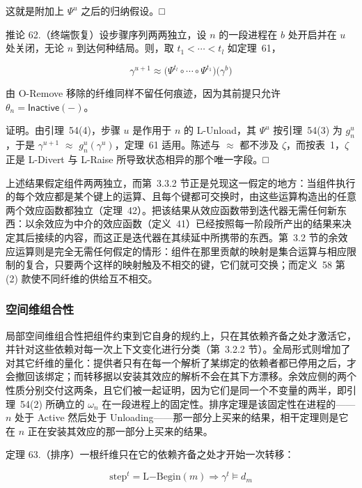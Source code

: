 \documentclass[
  10
]{article}
\begin{document}
这就是附加上 \(\Psi ^ { u }\) 之后的归纳假设。□

推论 62.（终端恢复）设步骤序列两两独立，设 \(n\) 的一段进程在 \(b\) 处开启并在 \(u\) 处关闭，无论 \(n\) 到达何种结局。则，取 \(t _ { 1 } < \cdots < t _ { l }\) 如定理~61，

\[
\gamma ^ { u + 1 } \approx \bigl ( \Psi ^ { t _ { l } } \circ \cdots \circ \Psi ^ { t _ { 1 } } \bigr ) \bigl ( \gamma ^ { b } \bigr )\tag{57}
\]

由 O-Remove 移除的纤维同样不留任何痕迹，因为其前提只允许 \(\theta _ { n } = \mathsf { I n a c t i v e } ( - )\)。

证明。由引理~54(4)，步骤 \(u\) 是作用于 \(n\) 的 L-Unload，其 \(\Psi ^ { u }\) 按引理~54(3) 为 \(g _ { n } ^ { u }\)，于是 \(\gamma ^ { u + 1 }\) $\approx$ \(g _ { n } ^ { u } ( \gamma ^ { u } )\)，定理~61 适用。陈述与 $\approx$ 都不涉及 \(\zeta\)，而按表~1，\(\zeta\) 正是 L-Divert 与 L-Raise 所导致状态相异的那个唯一字段。□

上述结果假定组件两两独立，而第~3.3.2 节正是兑现这一假定的地方：当组件执行的每个效应都是某个键上的运算、且每个键都可交换时，由这些运算构造出的任意两个效应函数都独立（定理~42）。把该结果从效应函数带到迭代器无需任何新东西：以余效应为中介的效应函数（定义~41）已经按照每一阶段所产出的结果来决定其后接续的内容，而这正是迭代器在其续延中所携带的东西。第~3.2 节的余效应运算则是完全无需任何假定的情形：组件在那里贡献的映射是集合运算与相应限制的复合，只要两个这样的映射触及不相交的键，它们就可交换；而定义~58 第 (2) 款使不同纤维的供给互不相交。

\subsubsection{空间维组合性} \label{spatial-composability}

局部空间维组合性把组件约束到它自身的规约上，只在其依赖齐备之处才激活它，并针对这些依赖对每一次上下文变化进行分类（第~3.2.2 节）。全局形式则增加了对其它纤维的量化：提供者只有在每一个解析了某绑定的依赖者都已停用之后，才会撤回该绑定；而转移据以安装其效应的解析不会在其下方漂移。余效应侧的两个性质分别交付这两条，且它们被一起证明，因为它们是同一个不变量的两半，即引理~54(2) 所确立的 \(\omega _ { n }\) 在一段进程上的固定性。排序定理是该固定性在进程的——\(n\) 处于 Active 然后处于 Unloading——那一部分上买来的结果，相干定理则是它在 \(n\) 正在安装其效应的那一部分上买来的结果。

定理 63.（排序）一根纤维只在它的依赖齐备之处才开始一次转移：

\[
{ \mathrm { s t e p } } ^ { t } = { \mathrm { L } } \mathrm { - B e g i n } ( m ) \Rightarrow \gamma ^ { t } \models d _ { m }\tag{58}
\]
\end{document}
